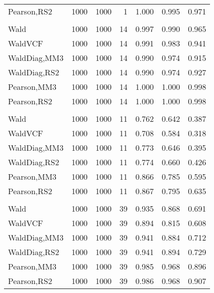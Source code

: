 \documentclass[
]{article}
\begin{document}
\begin{table}[H]
{\begin{tabular}[t]{lrrrrrr}
\hspace{1em}Pearson,RS2 & 1000 & 1000 & 1 & 1.000 & 0.995 & 0.971\\
\addlinespace[0.3em]
\multicolumn{7}{l}{\textbf{1F 15V}}\\
\hspace{1em}Wald & 1000 & 1000 & 14 & 0.997 & 0.990 & 0.965\\
\hspace{1em}WaldVCF & 1000 & 1000 & 14 & 0.991 & 0.983 & 0.941\\
\hspace{1em}WaldDiag,MM3 & 1000 & 1000 & 14 & 0.990 & 0.974 & 0.915\\
\hspace{1em}WaldDiag,RS2 & 1000 & 1000 & 14 & 0.990 & 0.974 & 0.927\\
\hspace{1em}Pearson,MM3 & 1000 & 1000 & 14 & 1.000 & 1.000 & 0.998\\
\hspace{1em}Pearson,RS2 & 1000 & 1000 & 14 & 1.000 & 1.000 & 0.998\\
\addlinespace[0.3em]
\multicolumn{7}{l}{\textbf{2F 10V}}\\
\hspace{1em}Wald & 1000 & 1000 & 11 & 0.762 & 0.642 & 0.387\\
\hspace{1em}WaldVCF & 1000 & 1000 & 11 & 0.708 & 0.584 & 0.318\\
\hspace{1em}WaldDiag,MM3 & 1000 & 1000 & 11 & 0.773 & 0.646 & 0.395\\
\hspace{1em}WaldDiag,RS2 & 1000 & 1000 & 11 & 0.774 & 0.660 & 0.426\\
\hspace{1em}Pearson,MM3 & 1000 & 1000 & 11 & 0.866 & 0.785 & 0.595\\
\hspace{1em}Pearson,RS2 & 1000 & 1000 & 11 & 0.867 & 0.795 & 0.635\\
\addlinespace[0.3em]
\multicolumn{7}{l}{\textbf{3F 15V}}\\
\hspace{1em}Wald & 1000 & 1000 & 39 & 0.935 & 0.868 & 0.691\\
\hspace{1em}WaldVCF & 1000 & 1000 & 39 & 0.894 & 0.815 & 0.608\\
\hspace{1em}WaldDiag,MM3 & 1000 & 1000 & 39 & 0.941 & 0.884 & 0.712\\
\hspace{1em}WaldDiag,RS2 & 1000 & 1000 & 39 & 0.941 & 0.894 & 0.729\\
\hspace{1em}Pearson,MM3 & 1000 & 1000 & 39 & 0.985 & 0.968 & 0.896\\
\hspace{1em}Pearson,RS2 & 1000 & 1000 & 39 & 0.986 & 0.968 & 0.907\\
\bottomrule
\end{tabular}}
\endgroup{}
\end{table}
\end{document}
